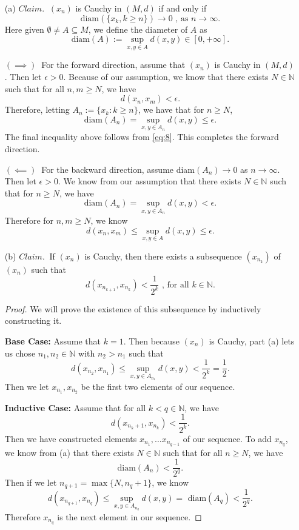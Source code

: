 \documentclass[12pt]{article}
\newcommand{\N}{\mathbb{N}}
\newcommand{\eq}[1]{\begin{equation*}#1\end{equation*}}
\newcommand{\qeq}[1]{\begin{equation}#1\end{equation}}
\begin{document}
\begin{itemize}
    \item [(a)] $Claim.~$ $(x_n)$ is Cauchy in $(M, d)$ if and only if
    \eq{\text{diam}(\{x_k, k \geq n\}) \to 0 \text{ , as } n \to \infty.}
    Here given $\emptyset \neq A \subseteq M$, we define the diameter of $A$ as
    \eq{\text{diam}(A) := \sup_{x, y \in A} d(x, y) \in [0, +\infty].}

    $(\implies)~ $ For the forward direction, assume that $(x_n)$ is Cauchy in $(M, d)$. Then let $\epsilon > 0$. Because of our assumption, we know that there exists $N \in \N$ such that for all $n, m \geq N$, we have \qeq{d(x_n, x_m) < \epsilon. \label{eq:8}}
    Therefore, letting $A_n := \{x_k : k \geq n\}$, we have that for $n \geq N$,
    \eq{\text{diam}(A_n) = \sup_{x, y \in A_n} d(x, y) \leq \epsilon.}
    The final inequality above follows from \eqref{eq:8}. This completes the forward direction.

    $(\impliedby)~ $ For the backward direction, assume diam$(A_n) \to 0$ as $n \to \infty$. Then let $\epsilon > 0$. We know from our assumption that there exists $N \in \N$ such that for $n \geq N$, we have
    \eq{\text{diam}(A_n) = \sup_{x, y \in A_n} d(x, y) < \epsilon.}
    Therefore for $n, m \geq N$, we know
    \eq{d(x_n, x_m) \leq \sup_{x, y \in A} d(x, y) \leq \epsilon.}

    \item [(b)] $Claim.~$ If $(x_n)$ is Cauchy, then there exists a subsequence $(x_{n_k})$ of $(x_n)$ such that
    \eq{d(x_{n_{k+1}}, x_{n_k}) < \frac{1}{2^k} \text{ , for all } k \in \N.}

    \begin{proof}
        We will prove the existence of this subsequence by inductively constructing it.

        \textbf{Base Case:} Assume that $k = 1$. Then because $(x_n)$ is Cauchy, part (a) lets us chose $n_1, n_2 \in \N$ with $n_2 > n_1$ such that
        \eq{d(x_{n_2}, x_{n_1}) \leq \sup_{x, y \in A_{n_1}} d(x, y) < \frac{1}{2^k} = \frac{1}{2}.}
        Then we let $x_{n_1}, x_{n_2}$ be the first two elements of our sequence.

        \textbf{Inductive Case:} Assume that for all $k < q \in \N$, we have
        \eq{d(x_{n_k+1}, x_{n_k}) < \frac{1}{2^k}.}
        Then we have constructed elements $x_{n_1}, \dots x_{n_{q-1}}$ of our sequence. To add $x_{n_q}$, we know from (a) that there exists $N \in \N$ such that for all $n \geq N$, we have
        \eq{\text{diam}(A_n) < \frac{1}{2^q}.}
        Then if we let $n_{q+1} = \max\{N, n_q + 1\}$, we know
        \eq{d(x_{n_{q+1}}, x_{n_q}) \leq \sup_{x, y \in A_{n_q}} d(x, y) = \text{ diam}(A_q) < \frac{1}{2^q}.}
        Therefore $x_{n_q}$ is the next element in our sequence.
    \end{proof}
\end{itemize}
\end{document}
